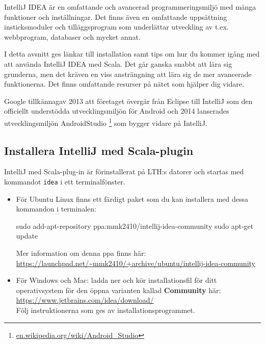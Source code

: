 IntelliJ IDEA är en omfattande och avancerad programmeringsmiljö med många funktioner och inställningar. Det finns även en omfattande uppsättning insticksmoduler och tilläggsprogram som underlättar utveckling av t.ex. webbprogram, databaser och mycket annat. 

I detta avsnitt ges länkar till installation samt tips om hur du kommer igång med att använda IntelliJ IDEA med Scala. Det går ganska snabbt att lära sig grunderna, men det kräven en viss ansträngning att lära sig de mer avancerade funktionerna. Det finns omfattande resurser på nätet som hjälper dig vidare. 

Google tillkännagav 2013 att företaget övergår från Eclipse till IntelliJ som den officiellt understödda utvecklingsmiljön för Android och 2014 lanserades utvecklingsmiljön AndroidStudio%
\footnote {\href{https://en.wikipedia.org/wiki/Android_Studio}{en.wikipedia.org/wiki/Android\_Studio}}
 som bygger vidare på IntelliJ. 

\subsection{Installera IntelliJ med Scala-plugin}\label{appendix:ide:intellij:install}

IntelliJ med Scala-plug-in är förinstallerat på LTH:s datorer och startas med kommandot \texttt{idea} i ett terminalfönster.

\begin{itemize}
\item För Ubuntu Linux finns ett färdigt paket som du kan installera med dessa kommandon i terminalen: 
\begin{REPLnonum}
sudo add-apt-repository ppa:mmk2410/intellij-idea-community
sudo apt-get update
\end{REPLnonum}
Mer information om denna ppa finns här:\\ \url{https://launchpad.net/~mmk2410/+archive/ubuntu/intellij-idea-community}\item För Windows och Mac: ladda ner och kör installationsfil för ditt operativsystem för den öppna varianten kallad \textbf{Community} här: \\
\url{https://www.jetbrains.com/idea/download/} \\
Följ instruktionerna som ges av installationsprogrammet.
\end{itemize}

